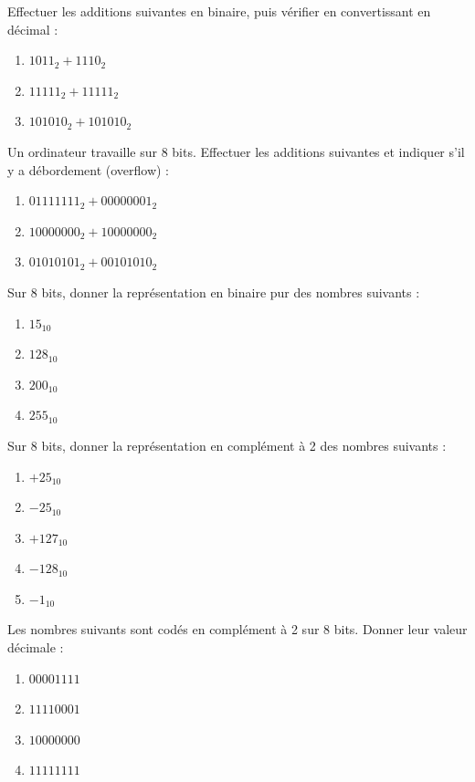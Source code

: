 \exo{}
Effectuer les additions suivantes en binaire, puis vérifier en convertissant en décimal :
\begin{enumerate}
    \item $1011_2 + 1110_2$
    \item $11111_2 + 11111_2$
    \item $101010_2 + 101010_2$
\end{enumerate}

\exo{}
Un ordinateur travaille sur 8 bits. Effectuer les additions suivantes et indiquer s'il y a débordement (overflow) :
\begin{enumerate}
    \item $01111111_2 + 00000001_2$
    \item $10000000_2 + 10000000_2$
    \item $01010101_2 + 00101010_2$
\end{enumerate}


\exo{}
Sur 8 bits, donner la représentation en binaire pur des nombres suivants :
\begin{enumerate}
    \item $15_{10}$
    \item $128_{10}$
    \item $200_{10}$
    \item $255_{10}$
\end{enumerate}

\exo{}
Sur 8 bits, donner la représentation en complément à 2 des nombres suivants :
\begin{enumerate}
    \item $+25_{10}$
    \item $-25_{10}$
    \item $+127_{10}$
    \item $-128_{10}$
    \item $-1_{10}$
\end{enumerate}

\exo{}
Les nombres suivants sont codés en complément à 2 sur 8 bits. Donner leur valeur décimale :
\begin{enumerate}
    \item $00001111$
    \item $11110001$
    \item $10000000$
    \item $11111111$
\end{enumerate}

